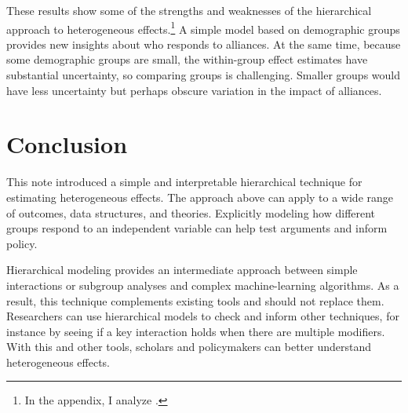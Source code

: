 \documentclass[12pt]{article}
\begin{document}
These results show some of the strengths and weaknesses of the hierarchical approach to heterogeneous effects.\footnote{In the appendix, I analyze \citet{BushPrather2020}.}
A simple model based on demographic groups provides new insights about who responds to alliances. 
At the same time, because some demographic groups are small, the within-group effect estimates have substantial uncertainty, so comparing groups is challenging. 
Smaller groups would have less uncertainty but perhaps obscure variation in the impact of alliances. 


\section{Conclusion}

This note introduced a simple and interpretable hierarchical technique for estimating heterogeneous effects. 
The approach above can apply to a wide range of outcomes, data structures, and theories. 
Explicitly modeling how different groups respond to an independent variable can help test arguments and inform policy.  


Hierarchical modeling provides an intermediate approach between simple interactions or subgroup analyses and complex machine-learning algorithms. 
As a result, this technique complements existing tools and should not replace them. 
Researchers can use hierarchical models to check and inform other techniques, for instance by seeing if a key interaction holds when there are multiple modifiers. 
With this and other tools, scholars and policymakers can better understand heterogeneous effects.


\singlespace
 
 


%
\end{document}
